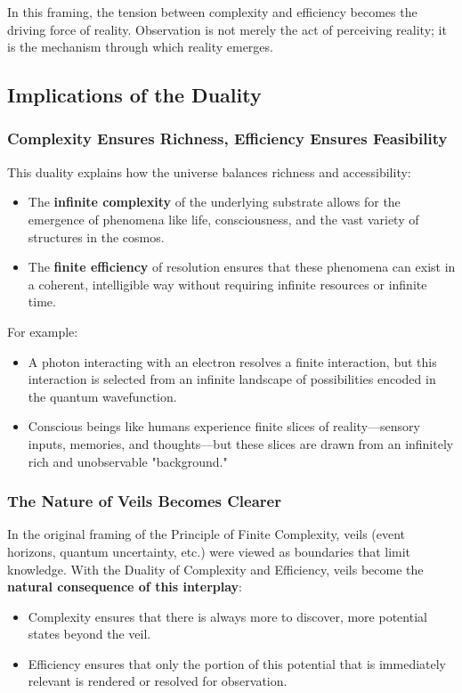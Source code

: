 \documentclass[12pt]{article}
\begin{document}
In this framing, the tension between complexity and efficiency becomes the driving force of reality. Observation is not merely the act of perceiving reality; it is the mechanism through which reality emerges.

\subsection{Implications of the Duality}

\subsubsection{Complexity Ensures Richness, Efficiency Ensures Feasibility}

This duality explains how the universe balances richness and accessibility:
\begin{itemize}
    \item The \textbf{infinite complexity} of the underlying substrate allows for the emergence of phenomena like life, consciousness, and the vast variety of structures in the cosmos.
    \item The \textbf{finite efficiency} of resolution ensures that these phenomena can exist in a coherent, intelligible way without requiring infinite resources or infinite time.
\end{itemize}

For example:
\begin{itemize}
    \item A photon interacting with an electron resolves a finite interaction, but this interaction is selected from an infinite landscape of possibilities encoded in the quantum wavefunction.
    \item Conscious beings like humans experience finite slices of reality—sensory inputs, memories, and thoughts—but these slices are drawn from an infinitely rich and unobservable "background."
\end{itemize}

\subsubsection{The Nature of Veils Becomes Clearer}

In the original framing of the Principle of Finite Complexity, veils (event horizons, quantum uncertainty, etc.) were viewed as boundaries that limit knowledge. With the Duality of Complexity and Efficiency, veils become the \textbf{natural consequence of this interplay}:
\begin{itemize}
    \item Complexity ensures that there is always more to discover, more potential states beyond the veil.
    \item Efficiency ensures that only the portion of this potential that is immediately relevant is rendered or resolved for observation.
\end{itemize}
\end{document}
